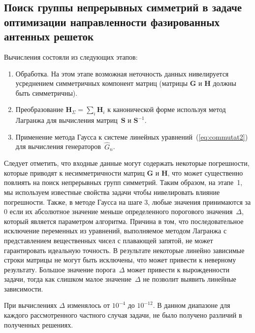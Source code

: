 \documentclass{llncs}
\begin{document}
\subsection*{Поиск группы непрерывных симметрий  в задаче оптимизации направленности фазированных антенных решеток}\label{sec:sym:exp}

Вычисления состояли из следующих этапов:
\begin{enumerate}
  \item Обработка. На этом этапе возможная неточность данных нивелируется усреднением симметричных компонент матриц (матрицы $\textbf{G}$ и $\textbf{H}$ должны быть симметричны).
  \item %
  Преобразование $ {\textbf{H}}_{\Sigma} = \sum_{i} \textbf{H}_i$ к канонической форме используя метод Лагранжа для вычисления матриц~$\textbf{S}$ и $\textbf{S}^{-1} $.
  \item Применение метода Гаусса к системе линейных уравнений~(\ref{eq:commutat2}) для вычисления генераторов~$\hat{G}_n$.
\end{enumerate}

Следует отметить, что входные данные могут содержать некоторые погрешности, которые приводят к несимметричности матриц $\textbf{G}$ и $\textbf{H}$, что может существенно повлиять на поиск непрерывных групп симметрий. Таким образом, на этапе~1, мы используем известные свойства задачи чтобы нивелировать влияние погрешности.
Также, в методе Гаусса на шаге 3, любые значения принимаются за 0 если их абсолютное значение меньше определенного порогового значения~$\Delta$, который является параметром алгоритма. Причина в том, что последовательное исключение переменных из уравнений, выполняемое методом Лагранжа с представлением вещественных чисел с плавающей запятой, не может гарантировать идеальную точность.
В результате некоторые линейно зависимые строки матрицы не могут быть исключены, что может привести к неверному результату.
Большое значение порога~$\Delta$ может привести к вырожденности задачи, тогда как слишком малое значение~$\Delta$ не позволит выявить линейные зависимости.

При вычислениях $\Delta$ изменялось от $ 10^{-4} $ до $ 10^{-12} $. В данном диапазоне для каждого рассмотренного частного случая задачи, не было получено различий в полученных решениях.

\end{document}

